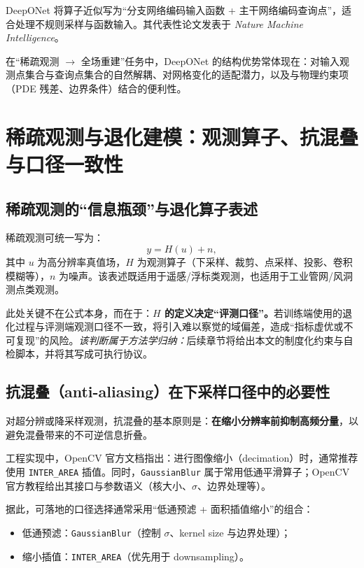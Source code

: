 DeepONet 将算子近似写为“分支网络编码输入函数 + 主干网络编码查询点”，适合处理不规则采样与函数输入。其代表性论文发表于 \emph{Nature Machine Intelligence}\cite{lu2021deeponet}。

在“稀疏观测 $\rightarrow$ 全场重建”任务中，DeepONet 的结构优势常体现在：对输入观测点集合与查询点集合的自然解耦、对网格变化的适配潜力，以及与物理约束项（PDE 残差、边界条件）结合的便利性\cite{lu2021deeponet}。


\section{稀疏观测与退化建模：观测算子、抗混叠与口径一致性}\label{sec:rw_degradation}

\subsection{稀疏观测的“信息瓶颈”与退化算子表述}\label{subsec:rw_obsmodel}

稀疏观测可统一写为：
\begin{equation}\label{eq:rw_obs}
y = H(u) + n,
\end{equation}
其中 $u$ 为高分辨率真值场，$H$ 为观测算子（下采样、裁剪、点采样、投影、卷积模糊等），$n$ 为噪声。该表述既适用于遥感/浮标类观测，也适用于工业管网/风洞测点类观测。

此处关键不在公式本身，而在于：\textbf{$H$ 的定义决定“评测口径”。}若训练端使用的退化过程与评测端观测口径不一致，将引入难以察觉的域偏差，造成“指标虚优或不可复现”的风险。\emph{该判断属于方法学归纳：}后续章节将给出本文的制度化约束与自检脚本，并将其写成可执行协议。


\subsection{抗混叠（anti-aliasing）在下采样口径中的必要性}\label{subsec:rw_antialias}

对超分辨或降采样观测，抗混叠的基本原则是：\textbf{在缩小分辨率前抑制高频分量}，以避免混叠带来的不可逆信息折叠。

工程实现中，OpenCV 官方文档指出：进行图像缩小（decimation）时，通常推荐使用 \texttt{INTER\_AREA} 插值\cite{opencv_resize}。同时，\texttt{GaussianBlur} 属于常用低通平滑算子；OpenCV 官方教程给出其接口与参数语义（核大小、$\sigma$、边界处理等）\cite{opencv_gaussianblur}。

据此，可落地的口径选择通常采用“低通预滤 + 面积插值缩小”的组合：
\begin{itemize}
  \item 低通预滤：\texttt{GaussianBlur}（控制 $\sigma$、kernel size 与边界处理）\cite{opencv_gaussianblur}；
  \item 缩小插值：\texttt{INTER\_AREA}（优先用于 downsampling）\cite{opencv_resize}。
\end{itemize}

